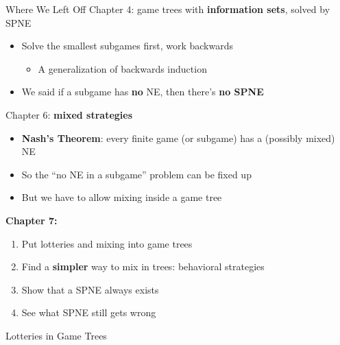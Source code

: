 \frame{\maketitle}

\begin{frame}{Where We Left Off}
Chapter 4: game trees with \textbf{information sets}, solved by SPNE
\begin{itemize}
    \item Solve the smallest subgames first, work backwards
    \begin{itemize}
        \item A generalization of backwards induction
    \end{itemize}
    \item We said if a subgame has \textbf{no} NE, then there's \textbf{no SPNE}
\end{itemize}
Chapter 6: \textbf{mixed strategies}
\begin{itemize}
    \item \textbf{Nash's Theorem}: every finite game (or subgame) has a (possibly mixed) NE
    \item So the ``no NE in a subgame'' problem can be fixed up
    \item But we have to allow mixing inside a game tree
\end{itemize}
\vfill
\textbf{Chapter 7:}
\begin{enumerate}
    \item Put lotteries and mixing into game trees
    \item Find a \textbf{simpler} way to mix in trees: behavioral strategies
    \item Show that a SPNE always exists
    \item See what SPNE still gets wrong
\end{enumerate}
\end{frame}


\begin{frame}[standout]
Lotteries in Game Trees
\end{frame}

